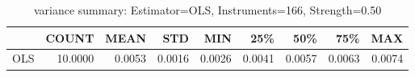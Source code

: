 \begin{table}[ht]
\centering
\caption{variance summary: Estimator=OLS, Instruments=166, Strength=0.50}
\begin{tabular}{lrrrrrrrr}
\toprule
 & COUNT & MEAN & STD & MIN & 25\% & 50\% & 75\% & MAX \\
\midrule
OLS & 10.0000 & 0.0053 & 0.0016 & 0.0026 & 0.0041 & 0.0057 & 0.0063 & 0.0074 \\
\bottomrule
\end{tabular}
\end{table}
